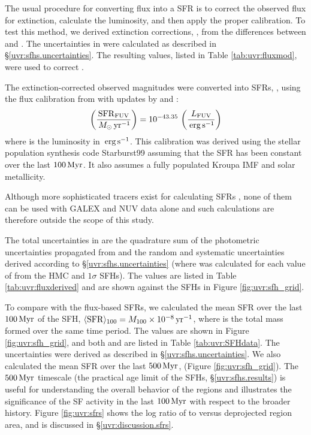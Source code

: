 The usual procedure for converting \fuv{} flux into a SFR is to correct the
observed flux for extinction, calculate the luminosity, and then apply the
proper calibration. To test this method, we derived \fuv{} extinction corrections,
\afuv{}, from the differences between \fuvsfh{} and
\fuvsfhz{}. The uncertainties in \afuv{} were calculated
as described in \S \ref{uvr:sfhs.uncertainties}. The resulting values, listed in
Table \ref{tab:uvr:fluxmod}, were used to correct \fuvobs{}.

The extinction-corrected observed \fuv{} magnitudes were converted into SFRs,
\sfrfuv{}, using the flux calibration from \citet{Kennicutt:1998} with
updates by \citet{Hao:2011} and \citet{Murphy:2011} \citep[see][]{Kennicutt:2012}:
\begin{equation}
\left(\frac{\mathrm{SFR}_{\mathrm{FUV}}}{\,M_\odot\,\mathrm{yr}^{-1}}\right) = 10^{-43.35}\,\left(\frac{L_{\mathrm{FUV}}}{\,\mathrm{erg}\,\mathrm{s}^{-1}}\right)
\end{equation}
where \lfuv{} is the \fuv{} luminosity in $\,\mathrm{erg}\,\mathrm{s}^{-1}$. This
calibration was derived using the stellar population synthesis code Starburst99
\citep{Leitherer:1999} assuming that the SFR has been constant over the last
$100\,\mathrm{Myr}$. It also assumes a fully populated Kroupa IMF
\citep{Kroupa:2001} and solar metallicity.

Although more sophisticated tracers exist for calculating SFRs \citep[e.g.,
hybrid tracers discussed in][]{Leroy:2012}, none of them can be used with GALEX
\fuv{} and NUV data alone and such calculations are therefore outside the scope of
this study.

The total uncertainties in \sfrfuv{} are the quadrature sum of the
photometric uncertainties propagated from \fuvobs{} and the random
and systematic uncertainties derived according to \S \ref{uvr:sfhs.uncertainties}
(where \sfrfuv{} was calculated for each value of \afuv{}
from the HMC and $1\sigma$ SFHs). The \sfrfuv{} values are listed in
Table \ref{tab:uvr:fluxderived} and are shown against the SFHs in Figure
\ref{fig:uvr:sfh_grid}.

To compare with the flux-based SFRs, we calculated the mean SFR over the last
$100\,\mathrm{Myr}$ of the SFH, $\langle\mathrm{SFR}\rangle_{100} = M_{100}
\times 10^{-8}\,\mathrm{yr}^{-1}$, where \massoneh{} is the total mass formed
over the same time period. The \sfroneh{} values are
shown in Figure \ref{fig:uvr:sfh_grid}, and both \massoneh{} and
\sfroneh{} are listed in Table \ref{tab:uvr:SFHdata}. The
uncertainties were derived as described in \S \ref{uvr:sfhs.uncertainties}. We also
calculated the mean SFR over the last $500\,\mathrm{Myr}$, \sfrfiveh{} (Figure \ref{fig:uvr:sfh_grid}).
The $500\,\mathrm{Myr}$ timescale (the practical age limit of the SFHs, \S \ref{uvr:sfhs.results}) is
useful for understanding the overall behavior of the regions and illustrates
the significance of the SF activity in the last $100\,\mathrm{Myr}$ with
respect to the broader history. Figure \ref{fig:uvr:sfrs} shows the log ratio of
\sfrfuv{} to \sfroneh{} versus deprojected
region area, and is discussed in \S \ref{uvr:discussion.sfrs}.


